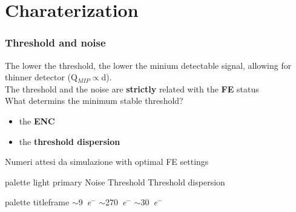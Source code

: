 \section{Charaterization}
    \begin{frame}
        \frametitle{Threshold and noise}
        The lower the threshold, the lower the minium detectable signal, allowing for thinner detector (Q$_{MIP}\propto$d). \\
        \medskip
        The threshold and the noise are \textbf{strictly} related with the \textbf{FE} status\\
        \medskip
        What determins the minimum stable threshold?
        \begin{itemize}
            \item the \textbf{ENC} 
            \item the \textbf{threshold dispersion} 
        \end{itemize}
        \medskip
        Numeri attesi da simulazione with optimal FE settings
        \begin{center}
        \begin{beamercolorbox}[rounded=true, center]{palette light primary}
            Noise \hspace*{1.2cm} Threshold \hspace*{1.2cm} Threshold dispersion
        \end{beamercolorbox}
        \begin{beamercolorbox}[rounded=true, center]{palette titleframe}
            \hspace*{-2.4cm} $\sim$\SI{9}{\elementarycharge}$^-$ \hspace*{1.4cm} $\sim$\SI{270}{\elementarycharge}$^-$ \hspace*{1.2cm} $\sim$\SI{30}{\elementarycharge}$^-$
        \end{beamercolorbox}
    \end{center}
    \end{frame}


